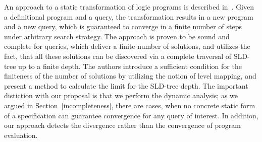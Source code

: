An approach to a static transformation of logic programs is described in~\cite{BoundedNondeterminism}. Given a definitional program and
a query, the transformation results in a new program and a new query, which is guaranteed to converge in a finite number of steps
under arbitrary search strategy. The approach is proven to be sound and complete for queries, which deliver a finite number of solutions,
and utilizes the fact, that all these solutions can be discovered via a complete traversal of SLD-tree up to a finite depth. The
authors introduce a sufficient condition for the finiteness of the number of solutions by utilizing the notion of level mapping, and
present a method to calculate the limit for the SLD-tree depth. The important distiction with our proposal is that we perform the
dynamic analysis; as we argued in Section~\ref{incompleteness}, there are cases, when no concrete static form of a specification can
guarantee convergence for any query of interest. In addition, our approach detects the divergence rather than the
convergence of program evaluation.
